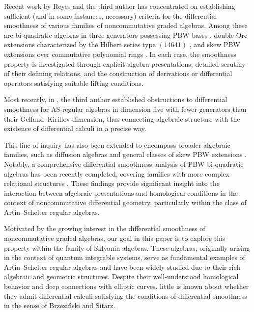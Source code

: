 \documentclass{amsart}
\theoremstyle{definition}
\theoremstyle{remark}
\numberwithin{equation}{section}
\begin{document}
Recent work by Reyes and the third author has concentrated on establishing sufficient (and in some instances, necessary) criteria for the differential smoothness of various families of noncommutative graded algebras. Among these are bi-quadratic algebras in three generators possessing PBW bases \cite{RubianoReyes2024DSBiquadraticAlgebras}, double Ore extensions characterized by the Hilbert series type $(14641)$ \cite{RubianoReyes2024DSDoubleOreExtensions}, and skew PBW extensions over commutative polynomial rings \cite{RubianoReyes2024DSSPBWKt}. In each case, the smoothness property is investigated through explicit algebra presentations, detailed scrutiny of their defining relations, and the construction of derivations or differential operators satisfying suitable lifting conditions. 

Most recently, in \cite{Rubiano2025DSASRegular5D}, the third author established obstructions to differential smoothness for AS-regular algebras in dimension five with fewer generators than their Gelfand–Kirillov dimension, thus connecting algebraic structure with the existence of differential calculi in a precise way.

This line of inquiry has also been extended to encompass broader algebraic families, such as diffusion algebras \cite{RubianoReyes2024DSDifA} and general classes of skew PBW extensions \cite{RubianoReyes2024DSSBWR}. Notably, a comprehensive differential smoothness analysis of PBW bi-quadratic algebras has been recently completed, covering families with more complex relational structures \cite{RubianoReyes2025DSnBQ}. These findings provide significant insight into the interaction between algebraic presentations and homological conditions in the context of noncommutative differential geometry, particularly within the class of Artin–Schelter regular algebras.

Motivated by the growing interest in the differential smoothness of noncommutative graded algebras, our goal in this paper is to explore this property within the family of Sklyanin algebras. These algebras, originally arising in the context of quantum integrable systems, serve as fundamental examples of Artin–Schelter regular algebras and have been widely studied due to their rich algebraic and geometric structures. Despite their well-understood homological behavior and deep connections with elliptic curves, little is known about whether they admit differential calculi satisfying the conditions of differential smoothness in the sense of Brzezi{\'n}ski and Sitarz.
\end{document}
